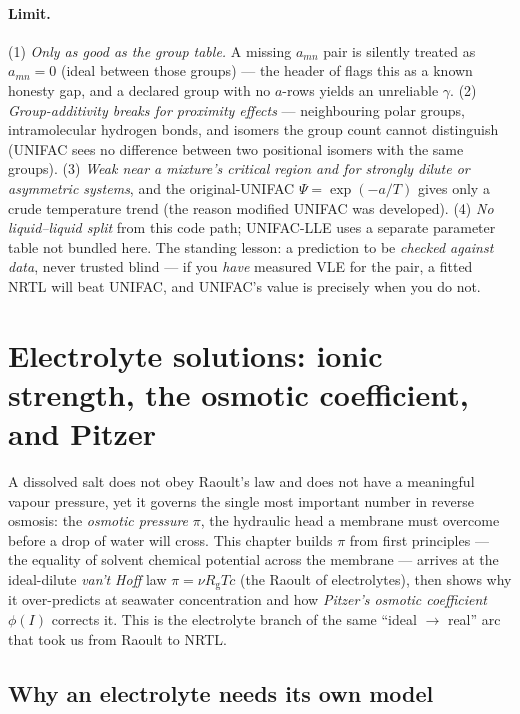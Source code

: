 \documentclass[11pt,a4paper]{article}
\newcommand{\Rgas}{R_{\!\mathrm{g}}}                %
\begin{document}
\paragraph{Limit.} (1) \emph{Only as good as the group table.} A missing
$a_{mn}$ pair is silently treated as $a_{mn} = 0$ (ideal between those
groups) --- the header of  flags this as a known
honesty gap, and a declared group with no $a$-rows yields an unreliable
$\gamma$. (2) \emph{Group-additivity breaks for proximity effects} ---
neighbouring polar groups, intramolecular hydrogen bonds, and isomers the
group count cannot distinguish (UNIFAC sees no difference between two
positional isomers with the same groups). (3) \emph{Weak near a mixture's
critical region and for strongly dilute or asymmetric systems}, and the
original-UNIFAC $\Psi = \exp(-a/T)$ gives only a crude temperature trend
(the reason modified UNIFAC was developed). (4) \emph{No liquid--liquid
split} from this code path; UNIFAC-LLE uses a separate parameter table
not bundled here. The standing lesson: a prediction to be \emph{checked
against data}, never trusted blind --- if you \emph{have} measured VLE for
the pair, a fitted NRTL will beat UNIFAC, and UNIFAC's value is precisely
when you do not.

\section{Electrolyte solutions: ionic strength, the osmotic
coefficient, and Pitzer}\label{ch:electrolytes}

\begin{whatyoulllearn}
A dissolved salt does not obey Raoult's law and does not have a
meaningful vapour pressure, yet it governs the single most important
number in reverse osmosis: the \emph{osmotic pressure} $\pi$, the
hydraulic head a membrane must overcome before a drop of water will
cross.  This chapter builds $\pi$ from first principles --- the
equality of solvent chemical potential across the membrane --- arrives
at the ideal-dilute \emph{van't Hoff} law $\pi = \nu \Rgas T c$ (the
Raoult of electrolytes), then shows why it over-predicts at seawater
concentration and how \emph{Pitzer's osmotic coefficient} $\phi(I)$
corrects it.  This is the electrolyte branch of the same ``ideal
$\to$ real'' arc that took us from Raoult to NRTL.
\end{whatyoulllearn}

\subsection{Why an electrolyte needs its own model}
\end{document}
